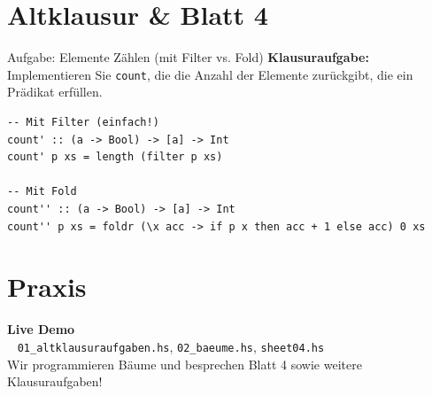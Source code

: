 \documentclass[aspectratio=169,11pt]{beamer}
\begin{document}
\section{Altklausur \& Blatt 4}

\begin{frame}[fragile]{Aufgabe: Elemente Zählen (mit Filter vs. Fold)}
    \textbf{Klausuraufgabe:} Implementieren Sie \texttt{count}, die die Anzahl der Elemente zurückgibt, die ein Prädikat erfüllen.
    
    \pause
    \begin{tcolorbox}[modernbox, title=Lösungswege]
\begin{lstlisting}
-- Mit Filter (einfach!)
count' :: (a -> Bool) -> [a] -> Int
count' p xs = length (filter p xs)

-- Mit Fold
count'' :: (a -> Bool) -> [a] -> Int
count'' p xs = foldr (\x acc -> if p x then acc + 1 else acc) 0 xs
\end{lstlisting}
    \end{tcolorbox}
\end{frame}

\section{Praxis}

\begin{frame}[plain]
    \begin{center}
        \Huge \textbf{Live Demo} \\
        \vspace{0.5cm}
        \large \faLaptopCode~ \texttt{01\_altklausuraufgaben.hs}, \texttt{02\_baeume.hs}, \texttt{sheet04.hs} \\
        \vspace{0.3cm}
        \normalsize Wir programmieren Bäume und besprechen Blatt 4 sowie weitere Klausuraufgaben!
    \end{center}
\end{frame}
\end{document}
